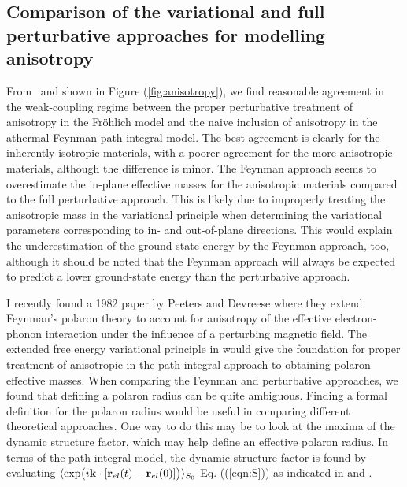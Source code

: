 \subsection{Comparison of the variational and full perturbative approaches for modelling anisotropy}

From~\cite{guster_frohlich_2021} and shown in Figure (\ref{fig:anisotropy}), we find reasonable agreement in the weak-coupling regime between the proper perturbative treatment of anisotropy in the Fr\"ohlich model and the naive inclusion of anisotropy in the athermal Feynman path integral model. The best agreement is clearly for the inherently isotropic materials, with a poorer agreement for the more anisotropic materials, although the difference is minor. The Feynman approach seems to overestimate the in-plane effective masses for the anisotropic materials compared to the full perturbative approach. This is likely due to improperly treating the anisotropic mass in the variational principle when determining the variational parameters corresponding to in- and out-of-plane directions. This would explain the underestimation of the ground-state energy by the Feynman approach, too, although it should be noted that the Feynman approach will always be expected to predict a lower ground-state energy than the perturbative approach. 

I recently found a 1982 paper by Peeters and Devreese \cite{Devreese1982} where they extend Feynman's polaron theory to account for anisotropy of the effective electron-phonon interaction under the influence of a perturbing magnetic field. The extended free energy variational principle in \cite{Devreese1982} would give the foundation for proper treatment of anisotropic in the path integral approach to obtaining polaron effective masses. When comparing the Feynman and perturbative approaches, we found that defining a polaron radius can be quite ambiguous. Finding a formal definition for the polaron radius would be useful in comparing different theoretical approaches. One way to do this may be to look at the maxima of the dynamic structure factor, which may help define an effective polaron radius. In terms of the path integral model, the dynamic structure factor is found by evaluating $\langle \exp(i \vb{k} \cdot [\vb{r}_{el}(t) - \vb{r}_{el}(0)]) \rangle_{S_0}$ Eq. ((\ref{eqn:S})) as indicated in \cite{Devreese2001} and \cite{Devreesetwo}.